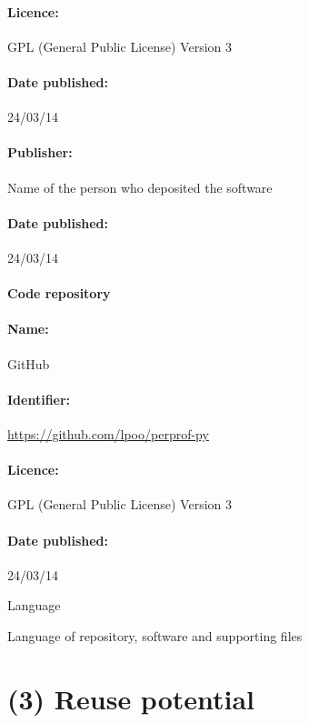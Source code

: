 \documentclass[10pt,a4paper]{article}
\begin{document}
    \paragraph{Licence:} GPL (General Public License) Version 3

    \paragraph{Date published:} 24/03/14

    \paragraph{Publisher:} Name of the person who deposited the software

    \paragraph{Date published:} 24/03/14

    \paragraph{Code repository}

    \paragraph{Name:} GitHub

    \paragraph{Identifier:} \url{https://github.com/lpoo/perprof-py}

    \paragraph{Licence:} GPL (General Public License) Version 3

    \paragraph{Date published:} 24/03/14

    Language

    Language of repository, software and supporting files

\section*{(3) Reuse potential}

\printbibliography
\end{document}
